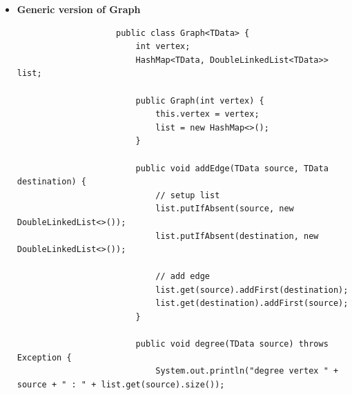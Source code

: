 \documentclass[12pt,titlepage]{article}
\begin{document}
\begin{enumerate}
{\begin{itemize}
{\begin{verbatim}
                            Node<TData> tmp = head;
                            for (int i = 0; i < index; i++) {
                                tmp = tmp.next;
                            }

                            return tmp.data;
                        }

                        int search(TData data) {
                            if (isEmpty()) return -1;

                            Node<TData> current = head;
                            int i = 0;
                            while (current != null) {
                                if (current.data == data) return i;
                                i++;
                                current = current.next;
                            }

                            return -1;
                        }
                    }
                \end{verbatim}
            }
            \item {
                \textbf{Generic version of Graph}
                \begin{verbatim}
                    public class Graph<TData> {
                        int vertex;
                        HashMap<TData, DoubleLinkedList<TData>> list;

                        public Graph(int vertex) {
                            this.vertex = vertex;
                            list = new HashMap<>();
                        }

                        public void addEdge(TData source, TData destination) {
                            // setup list
                            list.putIfAbsent(source, new DoubleLinkedList<>());
                            list.putIfAbsent(destination, new DoubleLinkedList<>());

                            // add edge
                            list.get(source).addFirst(destination);
                            list.get(destination).addFirst(source);
                        }

                        public void degree(TData source) throws Exception {
                            System.out.println("degree vertex " + source + " : " + list.get(source).size());


\end{verbatim}}
\end{itemize}}
\end{enumerate}
\end{document}
